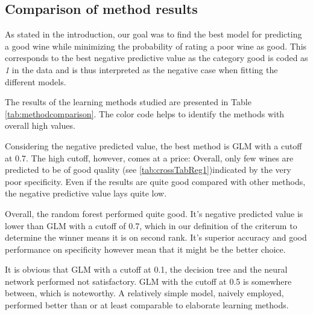 \documentclass[11pt,]{article}
\begin{document}
\hypertarget{comparison-of-method-results}{%
\subsection{Comparison of method
results}\label{comparison-of-method-results}}

As stated in the introduction, our goal was to find the best model for
predicting a good wine while minimizing the probability of rating a poor
wine as good. This corresponds to the best negative predictive value as
the category good is coded as \emph{1} in the data and is thus
interpreted as the negative case when fitting the different models.

The results of the learning methods studied are presented in Table
\ref{tab:methodcomparison}. The color code helps to identify the methods
with overall high values.

Considering the negative predicted value, the best method is GLM with a
cutoff at 0.7. The high cutoff, however, comes at a price: Overall, only
few wines are predicted to be of good quality (see
\ref{tab:crossTabReg1})indicated by the very poor specificity. Even if
the results are quite good compared with other methods, the negative
predictive value lays quite low.

Overall, the random forest performed quite good. It's negative predicted
value is lower than GLM with a cutoff of 0.7, which in our definition of
the criterum to determine the winner means it is on second rank. It's
superior accuracy and good performance on specificity however mean that
it might be the better choice.

It is obvious that GLM with a cutoff at 0.1, the decision tree and the
neural network performed not satisfactory. GLM with the cutoff at 0.5 is
somewhere between, which is noteworthy. A relatively simple model,
naively employed, performed better than or at least comparable to
elaborate learning methods.
\end{document}
